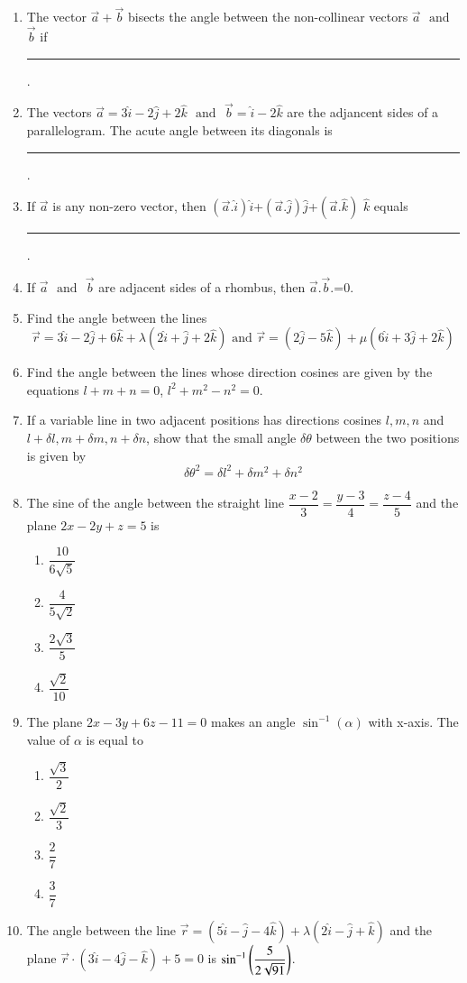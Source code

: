 \begin{enumerate}[label=\thesubsection.\arabic*,ref=\thesubsection.\theenumi]
\item The vector $\vec{a}+\vec{b}$ bisects the angle between the non-collinear vectors $\vec{a}$ $\text{ and }$ $\vec{b}$ if \rule{1cm}{0.15mm}.
\item The vectors $\vec{a}=3\hat{i}-2\hat{j}+2\hat{k}$ $\text{ and }$ $\vec{b}=\hat{i}-2\hat{k}$ are the adjancent sides of a parallelogram. The acute angle between its diagonals is \rule{1cm}{0.15mm}.
\item If $\vec{a}$ is  any non-zero vector, then $(\vec{a}.\hat{i})\hat{i}$+$(\vec{a}.\hat{j})\hat{j}$+$(\vec{a}.\hat{k})$ $\hat{k}$ equals \rule{1cm}{0.15mm}.
\item If $\vec{a}$ $\text{ and }$ $\vec{b}$ are adjacent sides of a rhombus, then $\vec{a}.\vec{b}$.=0.
\item Find the angle between the lines $$\overrightarrow{r}=3\hat{i}-2\hat{j}+6\hat{k}+\lambda(2\hat{i}+\hat{j}+2\hat{k})\text{ and } \overrightarrow{r}=(2\hat{j}-5\hat{k})+\mu(6\hat{i}+3\hat{j}+2\hat{k})$$
\item Find the angle between the lines whose direction cosines are given by the equations $l+m+n=0$, $l^2+m^2-n^2=0$.
\item If a variable line in two adjacent positions has directions cosines $l, m, n$ and $l+\delta l, m+\delta m, n+\delta n$, show that the small angle $\delta\theta$ between the two positions is given by $$\delta\theta^2=\delta l^2+\delta m^2+\delta n^2$$ 
\item The sine of the angle between the straight line $\dfrac{x-2}{3}=\dfrac{y-3}{4}=\dfrac{z-4}{5}$ and the plane $2x-2y+z=5$ is
\begin{enumerate}
	\item $\dfrac{10}{6\sqrt{5}}$ 
	\item $\dfrac{4}{5\sqrt{2}}$
	\item $\dfrac{2\sqrt{3}}{5}$
	\item $\dfrac{\sqrt{2}}{10}$
\end{enumerate}
\item The plane $2x-3y+6z-11=0$ makes an angle $\sin^{-1}(\alpha)$ with x-axis. The value of $\alpha$ is equal to 
\begin{enumerate}
	\item  $\dfrac{\sqrt{3}}{2}$
	\item  $\dfrac{\sqrt{2}}{3}$
	\item  $\dfrac{2}{7}$
	\item  $\dfrac{3}{7}$
\end{enumerate}
\item The angle between the line $\overrightarrow{r}=(5\hat{i}-\hat{j}-4\hat{k})+\lambda(2\hat{i}-\hat{j}+\hat{k})$ and the plane $\overrightarrow{r} \cdot (3\hat{i}-4\hat{j}-\hat{k})+5=0$ is $\sin^{-1}\left(\dfrac{5}{2\sqrt{91}}\right)$.

\end{enumerate}
